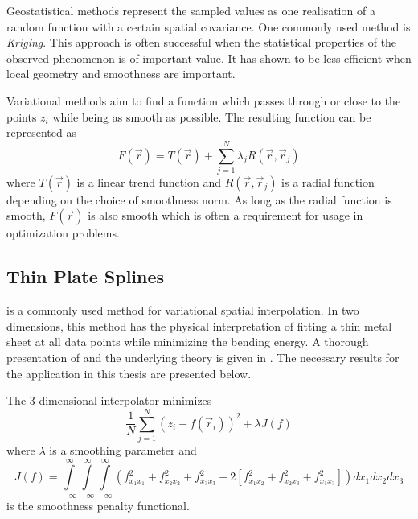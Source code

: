 Geostatistical methods represent the sampled values as one realisation of a random function with a certain spatial covariance. One commonly used method is \textit{Kriging}. This approach is often successful when the statistical properties of the observed phenomenon is of important value. It has shown to be less efficient when local geometry and smoothness are important.

Variational methods aim to find a function which passes through or close to the points $z_i$ while being as smooth as possible. The resulting function can be represented as
\begin{equation}
    F(\vec{r})=T(\vec{r})+\sum_{j=1}^{N}\lambda_jR(\vec{r},\vec{r}_j)
\end{equation}
where $T(\vec{r})$ is a linear trend function and $R(\vec{r},\vec{r}_j)$ is a radial function depending on the choice of smoothness norm. As long as the radial function is smooth, $F(\vec{r})$ is also smooth which is often a requirement for usage in optimization problems.
\subsection{Thin Plate Splines}
\abbrTPS is a commonly used method for variational spatial interpolation. In two dimensions, this method has the physical interpretation of fitting a thin metal sheet at all data points while minimizing the bending energy. A thorough presentation of \abbrTPS and the underlying theory is given in \cite{tps}. The necessary results for the application in this thesis are presented below.

The 3-dimensional \abbrTPS interpolator minimizes
\begin{equation}\label{eq:tps_loss}
    \frac{1}{N}\sum_{j=1}^N(z_i-f(\vec{r}_i))^2 + \lambda J(f)
\end{equation}
where $\lambda$ is a smoothing parameter and
\begin{equation}
    J(f)=\int\limits_{-\infty}^{\infty}\int\limits_{-\infty}^{\infty}\int\limits_{-\infty}^{\infty}(f^2_{x_1x_1} + f^2_{x_2x_2}+f^2_{x_3x_3}+2[f^2_{x_1x_2} + f^2_{x_2x_3} + f^2_{x_1x_3}])dx_1dx_2dx_3
\end{equation}
is the \abbrTPS smoothness penalty functional.

